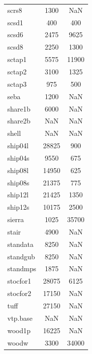 \begin{longtable}{lcc}
scrs8    &     1300 &   NaN \\
scsd1    &      400 &   400 \\
scsd6    &     2475 &  9625 \\
scsd8    &     2250 &  1300 \\
sctap1   &     5575 & 11900 \\
sctap2   &     3100 &  1325 \\
sctap3   &      975 &   500 \\
seba     &     1200 &   NaN \\
share1b  &     6000 &   NaN \\
share2b  &      NaN &   NaN \\
shell    &      NaN &   NaN \\
ship04l  &    28825 &   900 \\
ship04s  &     9550 &   675 \\
ship08l  &    14950 &   625 \\
ship08s  &    21375 &   775 \\
ship12l  &    21425 &  1350 \\
ship12s  &    10175 &  2500 \\
sierra   &     1025 & 35700 \\
stair    &     4900 &   NaN \\
standata &     8250 &   NaN \\
standgub &     8250 &   NaN \\
standmps &     1875 &   NaN \\
stocfor1 &    28075 &  6125 \\
stocfor2 &    17150 &   NaN \\
tuff     &    27150 &   NaN \\
vtp.base &      NaN &   NaN \\
wood1p   &    16225 &   NaN \\
woodw    &     3300 & 34000 \\
\end{longtable}

